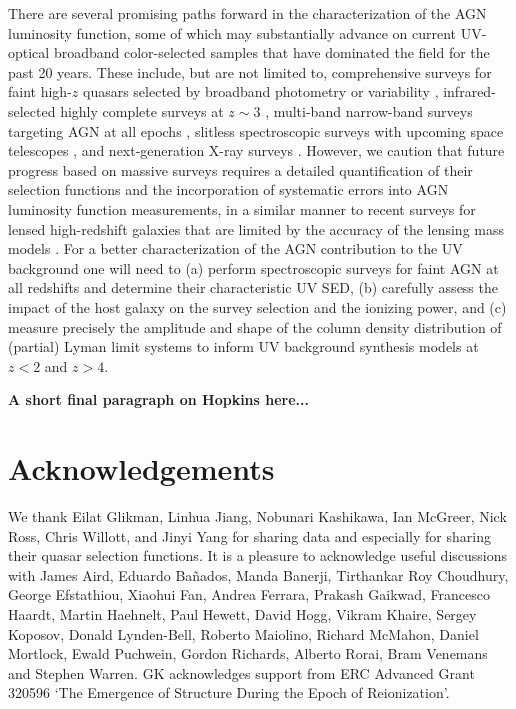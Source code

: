 \documentclass[fleqn,usenatbib]{mnras}
\begin{document}
There are several promising paths forward in the characterization of
the AGN luminosity function, some of which may substantially advance
on current UV-optical broadband color-selected samples that have
dominated the field for the past 20 years.  These include, but are not
limited to, comprehensive surveys for faint high-$z$ quasars selected
by broadband photometry \citep{2016ApJ...828...26M,
  2017ApJ...839...27W} or variability \citep{2017MNRAS.464.1693H},
infrared-selected highly complete surveys at $z\sim 3$
\citep{2017ApJ...851...13S, 2018AJ....155..110Y}, multi-band
narrow-band surveys targeting AGN at all epochs
\citep{2014arXiv1403.5237B}, slitless spectroscopic surveys with
upcoming space telescopes \citep{2011arXiv1110.3193L,
  2013arXiv1305.5422S}, and next-generation X-ray surveys
\citep[e.g.][]{2013A&A...558A..89K}. However, we caution that future
progress based on massive surveys requires a detailed quantification
of their selection functions and the incorporation of systematic
errors into AGN luminosity function measurements, in a similar manner
to recent surveys for lensed high-redshift galaxies that are limited
by the accuracy of the lensing mass models \citep{2017ApJ...843..129B,
  2018ApJ...854...73I, 2018arXiv180309747A}.  For a better
characterization of the AGN contribution to the UV background one will
need to (a) perform spectroscopic surveys for faint AGN at all
redshifts and determine their characteristic UV SED, (b) carefully
assess the impact of the host galaxy on the survey selection and the
ionizing power, and (c) measure precisely the amplitude and shape of
the column density distribution of (partial)  Lyman limit
systems to inform UV background synthesis models at $z<2$ and $z>4$.

\textbf{A short final paragraph on Hopkins here...}

\section*{Acknowledgements}

We thank Eilat Glikman, Linhua Jiang, Nobunari Kashi\-kawa, Ian
McGreer, Nick Ross, Chris Willott, and Jinyi Yang for sharing data and
especially for sharing their quasar selection functions.  It is a
pleasure to acknowledge useful discussions with James Aird, Eduardo
Ba\~nados, Manda Banerji, Tirthankar Roy Choudhury, George Efstathiou,
Xiaohui Fan, Andrea Ferrara, Prakash Gaikwad, Francesco Haardt, Martin
Haehnelt, Paul Hewett, David Hogg, Vikram Khaire, Sergey Koposov,
Donald Lynden-Bell, Roberto Maiolino, Richard McMahon, Daniel
Mortlock, Ewald Puchwein, Gordon Richards, Alberto Rorai, Bram
Venemans and Stephen Warren.  GK acknowledges support from ERC
Advanced Grant 320596 `The Emergence of Structure During the Epoch of
Reionization'.
\end{document}
